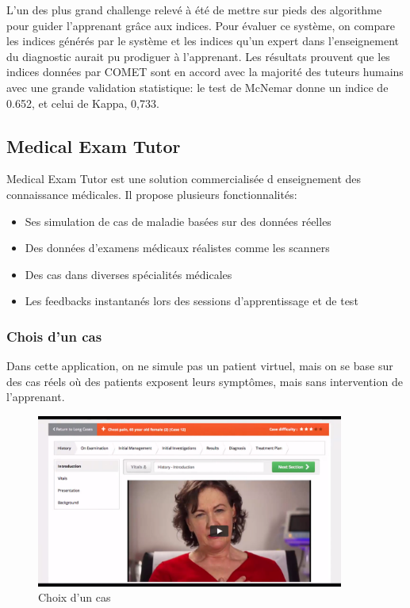 L'un des plus grand challenge relevé à été de mettre sur pieds des algorithme pour guider l'apprenant grâce aux indices. Pour évaluer ce système, on compare les indices générés par le système et les indices qu'un expert dans l'enseignement du diagnostic aurait pu prodiguer à l'apprenant. Les résultats prouvent que les indices données par COMET sont en accord avec la majorité des tuteurs humains avec une grande validation statistique: le test de McNemar donne un indice de 0.652, et celui de Kappa, 0,733.

\subsection{Medical Exam Tutor}

Medical Exam Tutor est une solution commercialisée d enseignement des connaissance médicales. Il propose plusieurs fonctionnalités:

\begin{itemize}
    \item Ses simulation de cas de maladie basées sur des données réelles
    \item Des données d'examens médicaux réalistes comme les scanners
    \item Des cas dans diverses spécialités médicales
    \item Les feedbacks instantanés lors des sessions d'apprentissage et de test
\end{itemize}

\subsubsection{Chois d'un cas}
Dans cette application, on ne simule pas un patient virtuel, mais on se base sur des cas réels où des patients exposent leurs symptômes, mais sans intervention de l'apprenant.
\begin{figure}
    \centering
    \includegraphics[width=0.9\textwidth]{figures/met/case choice.png}
    \captionsetup{justification=centering}
    \caption{Choix d'un cas}
\end{figure}

